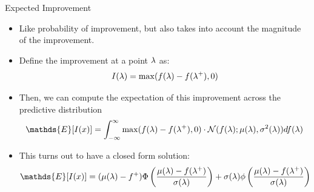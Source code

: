 \begin{frame}[c,fragile]{Expected Improvement}

\begin{itemize}
\vspace*{-0.2cm}
  \item Like probability of improvement, but also takes into account the \alert{magnitude} of the improvement.
  \item Define the improvement at a point $\mathbf{\lambda}$ as:\\
\vspace*{-0.2cm}
  \begin{equation}
  \nonumber{}I(\mathbf{\lambda}) = \max (f(\mathbf{\lambda}) - f(\mathbf{\lambda}^+), 0)
  \end{equation}
  \pause
\vspace*{-0.4cm}  
  \item Then, we can compute the expectation of this improvement across the predictive distribution
  \begin{eqnarray}
\nonumber{} \mathds{E}[I(x)] = \int_{-\infty}^{\infty} \max (f(\conf) - f(\conf^+), 0) \cdot \norm( f(\conf) ; \mu(\conf), \sigma^2(\conf) )  df(\conf) 
  \end{eqnarray}
  \pause
\vspace*{-0.2cm}
  \item This turns out to have a closed form solution:
  \small
  \begin{eqnarray}
\nonumber{} \mathds{E}[I(x)] = (\mu(\conf) - f^+) \Phi\left( \frac{\mu(\conf) - f(\conf^+)}{\sigma(\conf)} \right)  + \sigma(\conf) \phi \left( \frac{\mu(\conf) - f(\conf^+)}{\sigma(\conf)} \right)
  \end{eqnarray}
\end{itemize}

\end{frame}

